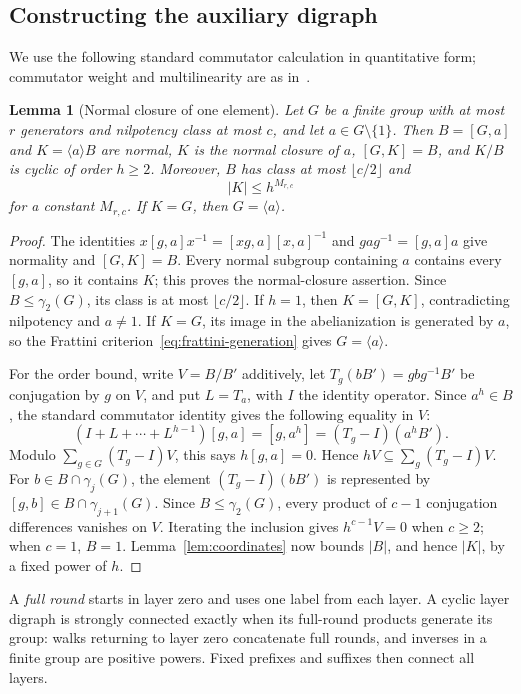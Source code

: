\documentclass[11pt,a4paper,reqno]{amsart}
\newtheorem{lemma}[theorem]{Lemma}
\theoremstyle{definition}
\theoremstyle{remark}
\numberwithin{equation}{section}
\newcommand{\gen}[1]{\langle #1\rangle}
\begin{document}
\subsection{Constructing the auxiliary digraph}\label{subsec:return}
We use the following standard commutator calculation in quantitative form; commutator weight and multilinearity are as in~\cite[Sections 5.1 and 5.2]{Robinson}.
\begin{lemma}[Normal closure of one element]\label{lem:normalclosure}
Let $G$ be a finite group with at most $r$ generators and nilpotency class at most $c$, and let $a\in G\setminus\{1\}$. Then $B=[G,a]$ and $K=\gen aB$ are normal, $K$ is the normal closure of $a$, $[G,K]=B$, and $K/B$ is cyclic of order $h\ge2$. Moreover, $B$ has class at most $\lfloor c/2\rfloor$ and
\begin{equation}\label{eq:normalorder}
 |K|\le h^{M_{r,c}}
\end{equation}
for a constant $M_{r,c}$. If $K=G$, then $G=\gen a$.
\end{lemma}
\begin{proof}
The identities $x[g,a]x^{-1}=[xg,a][x,a]^{-1}$ and $gag^{-1}=[g,a]a$ give normality and $[G,K]=B$. Every normal subgroup containing $a$ contains every $[g,a]$, so it contains $K$; this proves the normal-closure assertion. Since $B\le\gamma_2(G)$, its class is at most $\lfloor c/2\rfloor$. If $h=1$, then $K=[G,K]$, contradicting nilpotency and $a\ne1$. If $K=G$, its image in the abelianization is generated by $a$, so the Frattini criterion~\eqref{eq:frattini-generation} gives $G=\gen a$.

For the order bound, write $V=B/B'$ additively, let $T_g(bB')=gbg^{-1}B'$ be conjugation by $g$ on $V$, and put $L=T_a$, with $I$ the identity operator. Since $a^h\in B$, the standard commutator identity gives the following equality in $V$:
\[
 (I+L+\cdots+L^{h-1})[g,a]=[g,a^h]=(T_g-I)(a^hB').
\]
Modulo $\sum_{g\in G}(T_g-I)V$, this says $h[g,a]=0$. Hence $hV\subseteq\sum_g(T_g-I)V$. For $b\in B\cap\gamma_j(G)$, the element $(T_g-I)(bB')$ is represented by $[g,b]\in B\cap\gamma_{j+1}(G)$. Since $B\le\gamma_2(G)$, every product of $c-1$ conjugation differences vanishes on $V$. Iterating the inclusion gives $h^{c-1}V=0$ when $c\ge2$; when $c=1$, $B=1$. Lemma~\ref{lem:coordinates} now bounds $|B|$, and hence $|K|$, by a fixed power of $h$.
\end{proof}

A \emph{full round} starts in layer zero and uses one label from each layer. A cyclic layer digraph is strongly connected exactly when its full-round products generate its group: walks returning to layer zero concatenate full rounds, and inverses in a finite group are positive powers. Fixed prefixes and suffixes then connect all layers.
\end{document}
